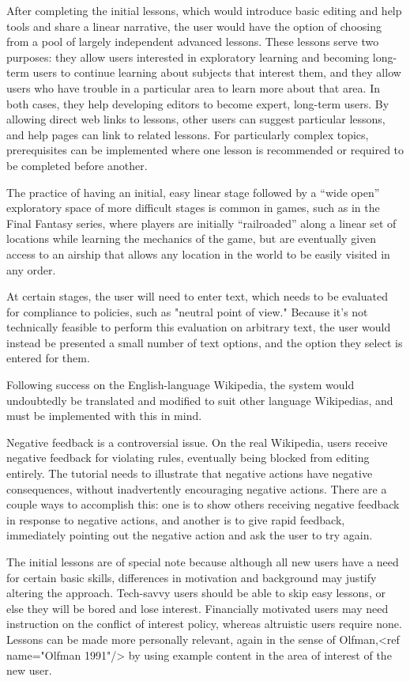 \documentclass{acm_proc_article-sp}
\begin{document}
After completing the initial lessons, which would introduce basic editing and help tools and share a linear narrative, the user would have the option of choosing from a pool of largely independent advanced lessons. These lessons serve two purposes: they allow users interested in exploratory learning and becoming long-term users to continue learning about subjects that interest them, and they allow users who have trouble in a particular area to learn more about that area. In both cases, they help developing editors to become expert, long-term users. By allowing direct web links to lessons, other users can suggest particular lessons, and help pages can link to related lessons. For particularly complex topics, prerequisites can be implemented where one lesson is recommended or required to be completed before another.

The practice of having an initial, easy linear stage followed by a “wide open” exploratory space of more difficult stages is common in games, such as in the Final Fantasy series, where players are initially “railroaded” along a linear set of locations while learning the mechanics of the game, but are eventually given access to an airship that allows any location in the world to be easily visited in any order.

At certain stages, the user will need to enter text, which needs to be evaluated for compliance to policies, such as "neutral point of view." Because it's not technically feasible to perform this evaluation on arbitrary text, the user would instead be presented a small number of text options, and the option they select is entered for them.

Following success on the English-language Wikipedia, the system would undoubtedly be translated and modified to suit other language Wikipedias, and must be implemented with this in mind.

Negative feedback is a controversial issue. On the real Wikipedia, users receive negative feedback for violating rules, eventually being blocked from editing entirely. The tutorial needs to illustrate that negative actions have negative consequences, without inadvertently encouraging negative actions. There are a couple ways to accomplish this: one is to show others receiving negative feedback in response to negative actions, and another is to give rapid feedback, immediately pointing out the negative action and ask the user to try again.

The initial lessons are of special note because although all new users have a need for certain basic skills, differences in motivation and background may justify altering the approach. Tech-savvy users should be able to skip easy lessons, or else they will be bored and lose interest.  Financially motivated users may need instruction on the conflict of interest policy, whereas altruistic users require none. Lessons can be made more personally relevant, again in the sense of Olfman,<ref name="Olfman 1991"/> by using example content in the area of interest of the new user.
\end{document}
